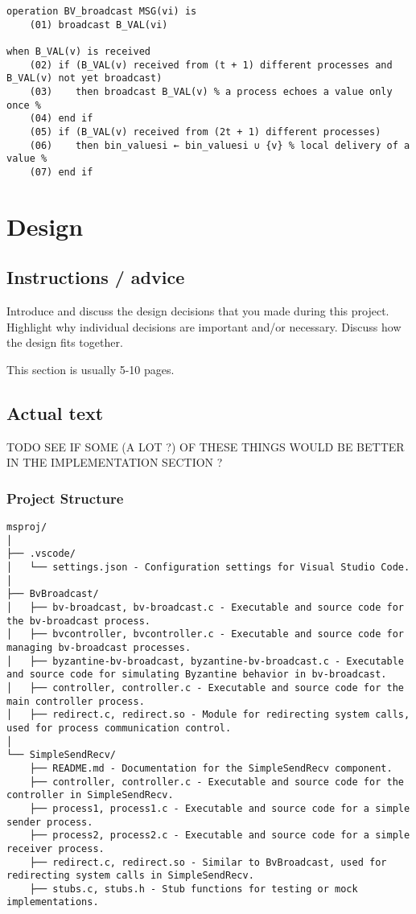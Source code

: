 \documentclass[a4paper,11pt,oneside]{report}
\begin{document}
\begin{verbatim}
operation BV_broadcast MSG(vi) is 
    (01) broadcast B_VAL(vi)

when B_VAL(v) is received
    (02) if (B_VAL(v) received from (t + 1) different processes and B_VAL(v) not yet broadcast)
    (03)    then broadcast B_VAL(v) % a process echoes a value only once %
    (04) end if
    (05) if (B_VAL(v) received from (2t + 1) different processes)
    (06)    then bin_valuesi ← bin_valuesi ∪ {v} % local delivery of a value % 
    (07) end if
\end{verbatim}


\chapter{Design}

\section{Instructions / advice}
Introduce and discuss the design decisions that you made during this project.
Highlight why individual decisions are important and/or necessary. Discuss
how the design fits together.

This section is usually 5-10 pages.

\section{Actual text}

TODO SEE IF SOME (A LOT ?) OF THESE THINGS WOULD BE BETTER IN THE IMPLEMENTATION SECTION ?

\subsection{Project Structure}

\begin{verbatim}
msproj/
│
├── .vscode/
│   └── settings.json - Configuration settings for Visual Studio Code.
│
├── BvBroadcast/
│   ├── bv-broadcast, bv-broadcast.c - Executable and source code for the bv-broadcast process.
│   ├── bvcontroller, bvcontroller.c - Executable and source code for managing bv-broadcast processes.
│   ├── byzantine-bv-broadcast, byzantine-bv-broadcast.c - Executable and source code for simulating Byzantine behavior in bv-broadcast.
│   ├── controller, controller.c - Executable and source code for the main controller process.
│   ├── redirect.c, redirect.so - Module for redirecting system calls, used for process communication control.
│
└── SimpleSendRecv/
    ├── README.md - Documentation for the SimpleSendRecv component.
    ├── controller, controller.c - Executable and source code for the controller in SimpleSendRecv.
    ├── process1, process1.c - Executable and source code for a simple sender process.
    ├── process2, process2.c - Executable and source code for a simple receiver process.
    ├── redirect.c, redirect.so - Similar to BvBroadcast, used for redirecting system calls in SimpleSendRecv.
    ├── stubs.c, stubs.h - Stub functions for testing or mock implementations.
\end{verbatim}
\end{document}
